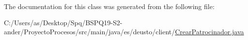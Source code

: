 The documentation for this class was generated from the following file\+:\begin{DoxyCompactItemize}
\item 
C\+:/\+Users/as/\+Desktop/\+Spq/\+B\+S\+P\+Q19-\/\+S2-\/ander/\+Proyecto\+Procesos/src/main/java/es/deusto/client/\mbox{\hyperlink{_crear_patrocinador_8java}{Crear\+Patrocinador.\+java}}\end{DoxyCompactItemize}
